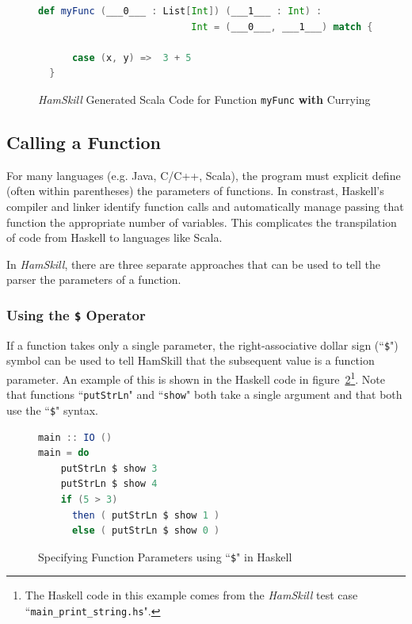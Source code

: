 \documentclass{report}
\begin{document}
\begin{figure}[H]
\begin{mdframed}
\begin{lstlisting}[basicstyle=\small, language=scala]
  def myFunc (___0___ : List[Int]) (___1___ : Int) :  
                           Int = (___0___, ___1___) match {
      
      case (x, y) =>  3 + 5
  }
\end{lstlisting}
\end{mdframed}
\caption{\textit{HamSkill} Generated Scala Code for Function \texttt{myFunc} \textbf{with} Currying}\label{fig:myFuncInScalaWithCurrying}
\end{figure}

\subsection{Calling a Function}\label{sec:callingAFunction}

For many languages (e.g. Java, C/C++, Scala), the program must explicit define (often within parentheses) the parameters of functions.  In constrast, Haskell's compiler and linker identify function calls and automatically manage passing that function the appropriate number of variables.  This complicates the transpilation of code from Haskell to languages like Scala.

In \textit{HamSkill}, there are three separate approaches that can be used to tell the parser the parameters of a function.

\subsubsection{Using the \texttt{\$} Operator}

If a function takes only a single parameter, the right-associative dollar sign (``\texttt{\$}") symbol can be used to tell HamSkill that the subsequent value is a function parameter.  An example of this is shown in the Haskell code in figure~\ref{fig:useDollarSignHaskell}\footnote{The Haskell code in this example comes from the \textit{HamSkill} test case ``\texttt{main\_print\_string.hs}".}.  Note that functions ``\texttt{putStrLn}" and ``\texttt{show}" both take a single argument and that both use the ``\texttt{\$}" syntax.

\begin{figure}[H]
\begin{mdframed}
\begin{lstlisting}[basicstyle=\small, language=scala]
main :: IO ()
main = do
    putStrLn $ show 3 
    putStrLn $ show 4
    if (5 > 3) 
      then ( putStrLn $ show 1 ) 
      else ( putStrLn $ show 0 )
\end{lstlisting}
\end{mdframed}
\caption{Specifying Function Parameters using ``\texttt{\$}" in Haskell}\label{fig:useDollarSignHaskell}
\end{figure}
\end{document}
